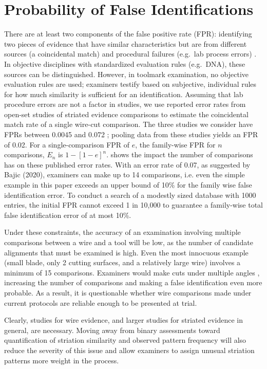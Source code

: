 \documentclass[9pt,twocolumn,twoside]{pnas-new}\usepackage[]{graphicx}\usepackage[dvipsnames]{xcolor}
\begin{document}
\section*{Probability of False Identifications}
There are at least two components of the false positive rate (FPR): identifying two pieces of evidence that have similar characteristics but are from different sources (a coincidental match) and procedural failures (e.g.\ lab process errors) \citep[p 50]{pcast}.
In objective disciplines with standardized evaluation rules (e.g.\ DNA), these sources can be distinguished.
However, in toolmark examination, no objective evaluation rules are used; examiners testify based on subjective, individual rules for how much similarity is sufficient for an identification.
Assuming that lab procedure errors are not a factor in studies, we use reported error rates from open-set studies of striated evidence comparisons to estimate the coincidental match rate of a single wire-cut comparison.
The three studies we consider \citep{bajic2020, mattijssen2021,best2022} have FPRs between 0.0045 \citep{best2022} and 0.072 \citep{mattijssen2021}; pooling data from these studies yields an FPR of 0.02.
For a single-comparison FPR of $e$, the family-wise FPR for $n$ comparisons, $E_n$ is $1 - [1-e]^n$.
 shows the impact the number of comparisons has on these published error rates. With an error rate of 0.07, as suggested by Bajic (2020), examiners can make up to 14 comparisons, i.e. even the simple example in this paper exceeds an upper bound of 10\% for the family wise false identification error.
To conduct a search of a modestly sized database with 1000 entries, the initial FPR cannot
exceed 1 in 10,000 to guarantee a family-wise total false identification error of at most 10\%.

Under these constraints, the accuracy of an examination involving multiple comparisons between a wire and a tool will be low, as the number of candidate alignments that must be examined is high.
Even the most innocuous example (small blade, only 2 cutting surfaces, and a relatively large wire) involves a minimum of 15 %
comparisons.
Examiners would make cuts under multiple angles \citep{baikerToolmarkVariabilityQuality2015}, increasing the number of comparisons and making a false identification even more probable.
As a result, it is questionable whether wire comparisons made under current protocols are reliable enough to be presented at trial.

Clearly, studies for wire evidence, and larger studies for striated evidence in general, are necessary.
Moving away from binary assessments toward quantification of striation similarity and observed pattern frequency will also reduce the severity of this issue and allow examiners to assign unusual striation patterns more weight in the process.
\end{document}
